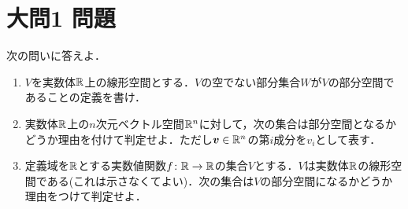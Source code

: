 \documentclass[dvipdfmx]{jsreport}
\begin{document}
\section{大問1 問題}
\begin{tcolorbox} %
	次の問いに答えよ．
\begin{enumerate}
	\item $V$を実数体$\mathbb{R}$上の線形空間とする．$V$の空でない部分集合$W$が$V$の部分空間であることの定義を書け．
	\item 実数体$\mathbb{R}$上の$n$次元ベクトル空間$\mathbb{R}^n$に対して，次の集合は部分空間となるかどうか理由を付けて判定せよ．ただし$\bm{v}\in \mathbb{R}^n$の第$i$成分を$v_i$として表す．
	\item 定義域を$\mathbb{R}$とする実数値関数$f\colon \mathbb{R}\to \mathbb{R}$の集合$V$とする．$V$は実数体$\mathbb{R}$の線形空間である(これは示さなくてよい)．次の集合は$V$の部分空間になるかどうか理由をつけて判定せよ．
\end{enumerate}
\end{tcolorbox}
\end{document}
